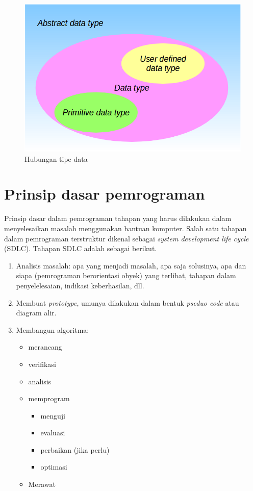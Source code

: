 \begin{figure}[H]
\centering
\includegraphics[scale=.5]{pics/datatype.png}
\caption{Hubungan tipe data}
\label{fig:datatype}
\end{figure} 

\section{Prinsip dasar pemrograman}
Prinsip dasar dalam pemrograman tahapan yang harus dilakukan dalam menyelesaikan masalah menggunakan bantuan komputer. Salah satu tahapan dalam pemrograman terstruktur dikenal sebagai \textit{system development life cycle} (SDLC). Tahapan SDLC adalah sebagai berikut.
\begin{enumerate}
\item Analisis masalah: apa yang menjadi masalah, apa saja solusinya, apa dan siapa (pemrograman berorientasi obyek) yang terlibat, tahapan dalam penyelelesaian, indikasi keberhasilan, dll.
\item Membuat \textit{prototype}, umunya dilakukan dalam bentuk \textit{pseduo code} atau diagram alir.
\item Membangun algoritma:
\begin{itemize}
\item merancang \label{sec:rancangan}
\item verifikasi
\item analisis
\item memprogram
\begin{itemize}
\item menguji
\item evaluasi
\item perbaikan (jika perlu)
\item optimasi
\end{itemize}
\item Merawat
\end{itemize}
\end{enumerate}

